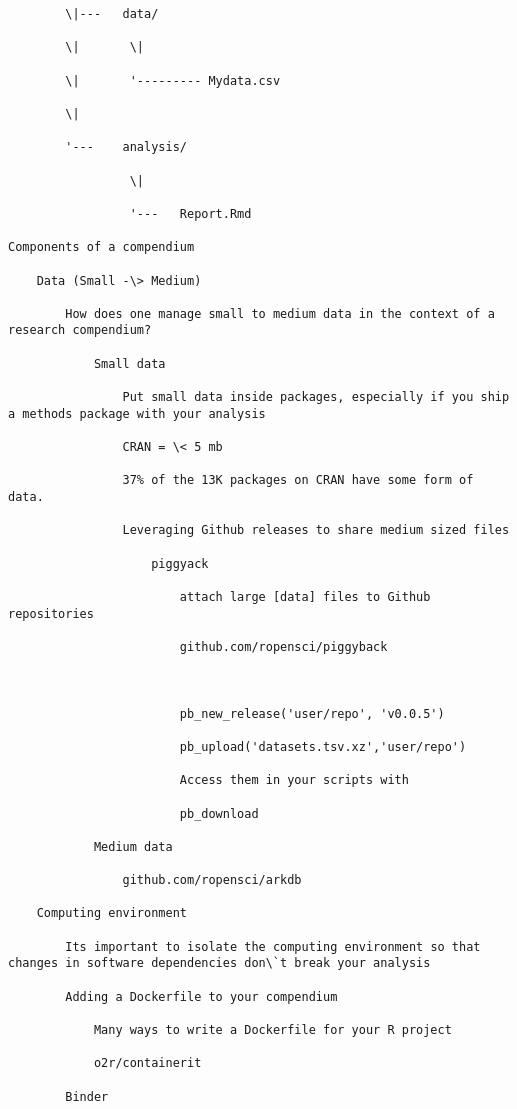 \documentclass[
]{book}
\begin{document}
\begin{verbatim}
        \|---   data/

        \|       \|

        \|       '--------- Mydata.csv

        \|

        '---    analysis/

                 \|

                 '---   Report.Rmd

Components of a compendium

    Data (Small -\> Medium)

        How does one manage small to medium data in the context of a research compendium?

            Small data

                Put small data inside packages, especially if you ship a methods package with your analysis

                CRAN = \< 5 mb

                37% of the 13K packages on CRAN have some form of data.

                Leveraging Github releases to share medium sized files

                    piggyack

                        attach large [data] files to Github repositories

                        github.com/ropensci/piggyback



                        pb_new_release('user/repo', 'v0.0.5')

                        pb_upload('datasets.tsv.xz','user/repo')

                        Access them in your scripts with

                        pb_download

            Medium data

                github.com/ropensci/arkdb

    Computing environment

        Its important to isolate the computing environment so that changes in software dependencies don\`t break your analysis

        Adding a Dockerfile to your compendium

            Many ways to write a Dockerfile for your R project

            o2r/containerit

        Binder


\end{verbatim}
\end{document}
